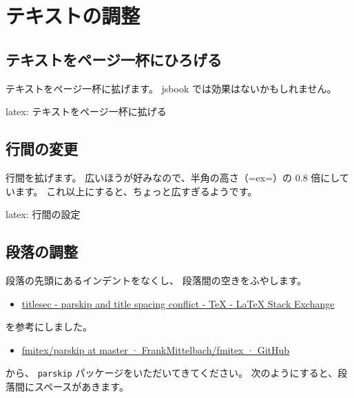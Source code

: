 \documentclass[dvipdfmx,a4j,14pt,uplatex,openany]{jsbook}
\begin{document}
\section{テキストの調整}
\label{sec:org8b0e76d}
\subsection{テキストをページ一杯にひろげる}
\label{sec:org97f92a1}
テキストをページ一杯に拡げます。
jsbook では効果はないかもしれません。

\begin{programlist}[label={org0c5d351}]{latex}{: テキストをページ一杯に拡げる}\setlength{\textwidth}{\fullwidth}
\end{programlist}

\subsection{行間の変更}
\label{sec:org0cb0388}
行間を拡げます。
広いほうが好みなので、半角の高さ（=ex=）の 0.8 倍にしています。
これ以上にすると、ちょっと広すぎるようです。

\begin{programlist}[label={org5de4ae6}]{latex}{: 行間の設定}%
\setlength{\baselineskip}{0.8 ex}
\end{programlist}

\subsection{段落の調整}
\label{sec:orga0c9bef}
段落の先頭にあるインデントをなくし、
段落間の空きをふやします。

\begin{itemize}
\item \href{https://tex.stackexchange.com/questions/358588/parskip-and-title-spacing-conflict}{titlesec - parskip and title spacing conflict - \TeX{} - \LaTeX{} Stack Exchange}
\end{itemize}

を参考にしました。

\begin{itemize}
\item \href{https://github.com/FrankMittelbach/fmitex/tree/master/parskip}{fmitex/parskip at master · FrankMittelbach/fmitex · GitHub}
\end{itemize}

から、 \texttt{parskip} パッケージをいただいてきてください。
次のようにすると、段落間にスペースがあきます。
\end{document}
